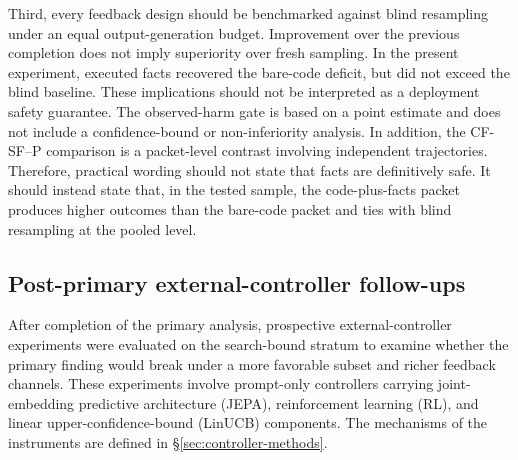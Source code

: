 \documentclass{article}
\numberwithin{equation}{section}  %
\newcommand{\fitwidth}[1]{\resizebox{\ifdim\width>\linewidth \linewidth\else\width\fi}{!}{#1}}
\theoremstyle{definition}
\newcommand{\armP}{\textsf{P}}
\newcommand{\armCF}{\textsf{CF-SF}}
\begin{document}
Third, every feedback design should be benchmarked against blind resampling under an equal
output-generation budget. Improvement over the previous completion does not imply superiority
over fresh sampling. In the present experiment, executed facts recovered the bare-code
deficit, but did not exceed the blind baseline. These implications should not be interpreted
as a deployment safety guarantee. The observed-harm gate is based on a point estimate and does
not include a confidence-bound or non-inferiority analysis. In addition, the \armCF{}--\armP{}
comparison is a packet-level contrast involving independent trajectories. Therefore,
practical wording should not state that facts are definitively safe. It should instead state
that, in the tested sample, the code-plus-facts packet produces higher outcomes than the
bare-code packet and ties with blind resampling at the pooled level.

\subsection{Post-primary external-controller follow-ups}
\label{sec:controllers}

After completion of the primary analysis, prospective external-controller experiments were
evaluated on the search-bound stratum to examine whether the primary finding would break under
a more favorable subset and richer feedback channels. These experiments involve prompt-only
controllers carrying joint-embedding predictive architecture (JEPA), reinforcement learning
(RL), and linear upper-confidence-bound (LinUCB) components. The mechanisms of the instruments
are defined in \S\ref{sec:controller-methods}.

\begin{table}[t]
\centering
\caption{Six external-controller experiments conducted on the search-bound stratum
($1/3{\le}q_0{<}1$) after completion of the primary preregistered analysis. All use matched
output budget $R{=}4$ and frozen 0.5--1.5B Ollama models. The endpoint is a fresh candidate
passing both the public and prompt-hidden tiers (true unlock). These experiments were not
preregistered and were not subjected to the audit invariants of the primary frozen evaluation
pipeline. $n$ denotes the number of live-confirmed search-bound units or the specified cell
count. Abbreviations: RD, risk difference; pp, percentage points.}
\label{tab:controllers}
\fitwidth{}
\end{table}
\end{document}
